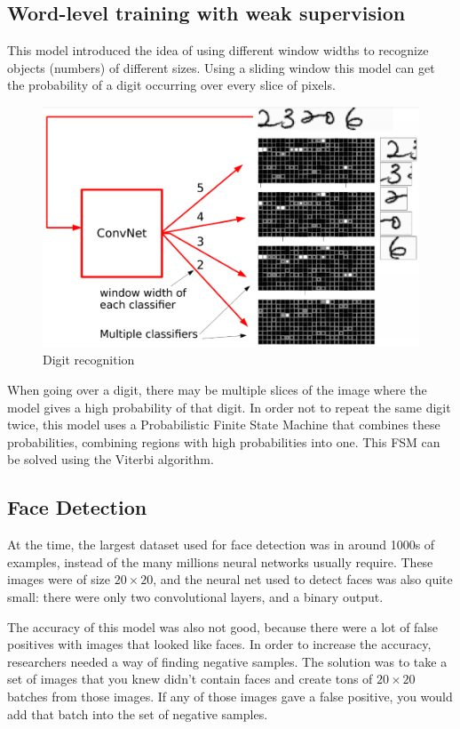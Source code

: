 \subsection{Word-level training with weak supervision}

This model introduced the idea of using different window widths to recognize objects (numbers) of different sizes.
Using a sliding window this model can get the probability of a digit occurring over every slice of pixels.

\begin{figure}[!ht]
\centering
	\includegraphics[width=0.5\linewidth]{lectures/04-a/images/word-level.png}
	\caption{Digit recognition}
\label{fig:WordLevel}
\end{figure}

When going over a digit, there may be multiple slices of the image where the model gives a high probability of that digit.
In order not to repeat the same digit twice, this model uses a Probabilistic Finite State Machine that combines these probabilities, 
combining regions with high probabilities into one.
This FSM can be solved using the Viterbi algorithm.

\subsection{Face Detection}

At the time, the largest dataset used for face detection was in around 1000s of examples, instead of the many millions neural networks usually require.
These images were of size $20\times20$, and the neural net used to detect faces was also quite small: there were only two convolutional layers, and a binary output.

The accuracy of this model was also not good, because there were a lot of false positives with images that looked like faces.
In order to increase the accuracy, researchers needed a way of finding negative samples.
The solution was to take a set of images that you knew didn't contain faces and create tons of $20\times20$ batches from those images.
If any of those images gave a false positive, you would add that batch into the set of negative samples.

